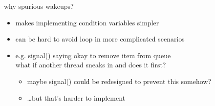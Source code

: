 \begin{frame}{why spurious wakeups?}
  \begin{itemize}
    \item makes implementing condition variables simpler
    \vspace{.5cm}
    \item<2-> can be hard to avoid loop in more complicated scenarios
    \item<2-> e.g. signal() saying okay to remove item from queue \\ what if another thread sneaks in and does it first?
        \begin{itemize}
        \item maybe signal() could be redesigned to prevent this somehow?
        \item \ldots but that's harder to implement
        \end{itemize}
    \end{itemize}
\end{frame}
